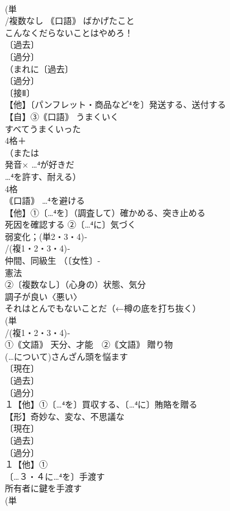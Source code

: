 \documentclass[8pt]{extreport}
\begin{document}
\begin{CJK}{UTF8}{min}
\\	(単
\\	/複数なし ｟口語｠ ばかげたこと 
\\	こんなくだらないことはやめろ！ 
\\	〔過去〕
\\	〔過分〕
\\	（まれに〔過去〕
\\	〔過分〕
\\	〔接Ⅱ〕
\\	【他】〔パンフレット・商品など⁴を〕発送する、送付する 
\\	【自】③｟口語｠ うまくいく 
\\	すべてうまくいった
\\	4格＋
\\	（または
\\	発音×	…⁴が好きだ 
\\	…⁴を許す、耐える）
\\	4格 
\\	｟口語｠ …⁴を避ける
\\	【他】①〔…⁴を〕（調査して）確かめる、突き止める 
\\	死因を確認する ②〔…⁴に〕気づく　
\\	弱変化；(単2・3・4)‐
\\	/(複1・2・3・4)‐
\\	仲間、同級生 （〔女性〕-
\\	憲法 
\\	②〔複数なし〕（心身の）状態、気分 
\\	調子が良い〈悪い〉 
\\	それはとんでもないことだ（←樽の底を打ち抜く）
\\	(単
\\	/(複1・2・3・4)‐
\\	①｟文語｠ 天分、才能　②｟文語｠ 贈り物 
\\	(…について)さんざん頭を悩ます
\\	〔現在〕
\\	〔過去〕
\\	〔過分〕
\\	１【他】①〔…⁴を〕買収する、〔…⁴に〕賄賂を贈る 
\\	【形】奇妙な、変な、不思議な 
\\	〔現在〕
\\	〔過去〕
\\	〔過分〕
\\	１【他】①
\\	〔…３・４に…⁴を〕手渡す 
\\	所有者に鍵を手渡す
\\	(単

\end{CJK}
\end{document}
